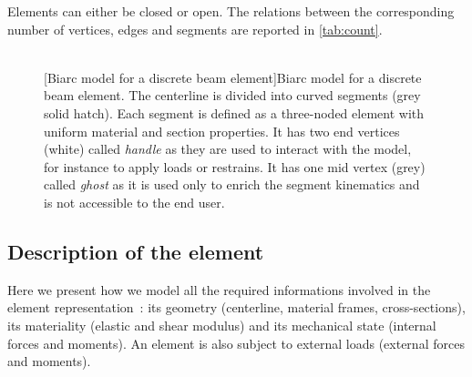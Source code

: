 Elements can either be closed or open. The relations between the corresponding number of vertices, edges and segments are reported in \cref{tab:count}.

\begin{figure}[p]
\begin{fullpage}
	\captionsetup[subfloat]{captionskip=20pt}
     	\centering
     	 \\
	\vspace{30pt}
	\vspace{10pt}
	[Biarc model for a discrete beam element]{Biarc model for a discrete beam element. The centerline is divided into curved segments (grey solid hatch). Each segment is defined as a three-noded element with uniform material and section properties. It has two end vertices (white) called \emph{handle} as they are used to interact with the model, for instance to apply loads or restrains. It has one mid vertex (grey) called \emph{ghost} as it is used only to enrich the segment kinematics and is not accessible to the end user.}
\end{fullpage}
\end{figure}

\subsection{Description of the element}
Here we present how we model all the required informations involved in the element representation~: its geometry (centerline, material frames, cross-sections), its materiality (elastic and shear modulus) and its mechanical state (internal forces and moments). An element is also subject to external loads (external forces and moments).
